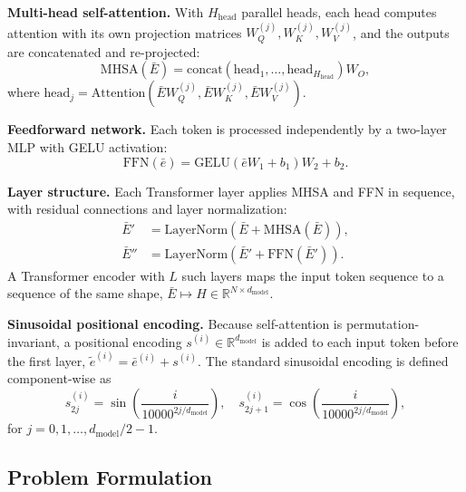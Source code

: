 \documentclass[journal]{IEEEtran}
\begin{document}
\textbf{Multi-head self-attention.} With $H_{\mathrm{head}}$ parallel heads, each head computes attention with its own projection matrices $W_Q^{(j)}, W_K^{(j)}, W_V^{(j)}$, and the outputs are concatenated and re-projected:
\begin{equation}
    \mathrm{MHSA}(\bar{E})
    = \mathrm{concat}\!\left(\mathrm{head}_1, \ldots, \mathrm{head}_{H_{\mathrm{head}}}\right)W_O,
    \label{eq:mhsa}
\end{equation}
where $\mathrm{head}_j = \mathrm{Attention}(\bar{E}W_Q^{(j)}, \bar{E}W_K^{(j)}, \bar{E}W_V^{(j)})$.

\textbf{Feedforward network.} Each token is processed independently by a two-layer MLP with GELU activation:
\begin{equation}
    \mathrm{FFN}(\bar{e}) = \mathrm{GELU}(\bar{e}W_1 + b_1)W_2 + b_2.
    \label{eq:ffn}
\end{equation}

\textbf{Layer structure.} Each Transformer layer applies MHSA and FFN in sequence, with residual connections and layer normalization:
\begin{align}
    \bar{E}' &= \mathrm{LayerNorm}\!\left(\bar{E} + \mathrm{MHSA}(\bar{E})\right), \label{eq:layer_ln1}\\
    \bar{E}'' &= \mathrm{LayerNorm}\!\left(\bar{E}' + \mathrm{FFN}(\bar{E}')\right). \label{eq:layer_ln2}
\end{align}
A Transformer encoder with $L$ such layers maps the input token sequence to a sequence of the same shape, $\bar{E} \mapsto H \in \mathbb{R}^{N \times d_{\mathrm{model}}}$.

\textbf{Sinusoidal positional encoding.} Because self-attention is permutation-invariant, a positional encoding $s^{(i)} \in \mathbb{R}^{d_{\mathrm{model}}}$ is added to each input token before the first layer, $\tilde{e}^{(i)} = \bar{e}^{(i)} + s^{(i)}$. The standard sinusoidal encoding is defined component-wise as
\begin{equation}
    s^{(i)}_{2j} = \sin\!\left(\frac{i}{10000^{2j/d_{\mathrm{model}}}}\right),\quad
    s^{(i)}_{2j+1} = \cos\!\left(\frac{i}{10000^{2j/d_{\mathrm{model}}}}\right),
    \label{eq:pos_enc}
\end{equation}
for $j = 0, 1, \ldots, d_{\mathrm{model}}/2 - 1$.

\subsection{Problem Formulation}
\label{sec:problem}
\end{document}
